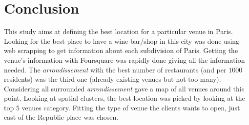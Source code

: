 \documentclass[english]{article}
\begin{document}
	\section{Conclusion}	
	This study aims at defining the best location for a particular venue in Paris. Looking for the best place to have a wine bar/shop in this city was done using web scrapping to get information about each subdivision of Paris. Getting the venue's information with Foursquare was rapidly done giving all the information needed. The \textit{arrondissement} with the best number of restaurants (and per $1000$ residents) was the third one (already existing venues but not too many). Considering all surrounded \textit{arrondissement} gave a map of all venues around this point. Looking at spatial clusters, the best location was picked by looking at the top $5$ venues category. Fitting the type of venue the clients wants to open, just east of the Republic place was chosen.
\end{document}

